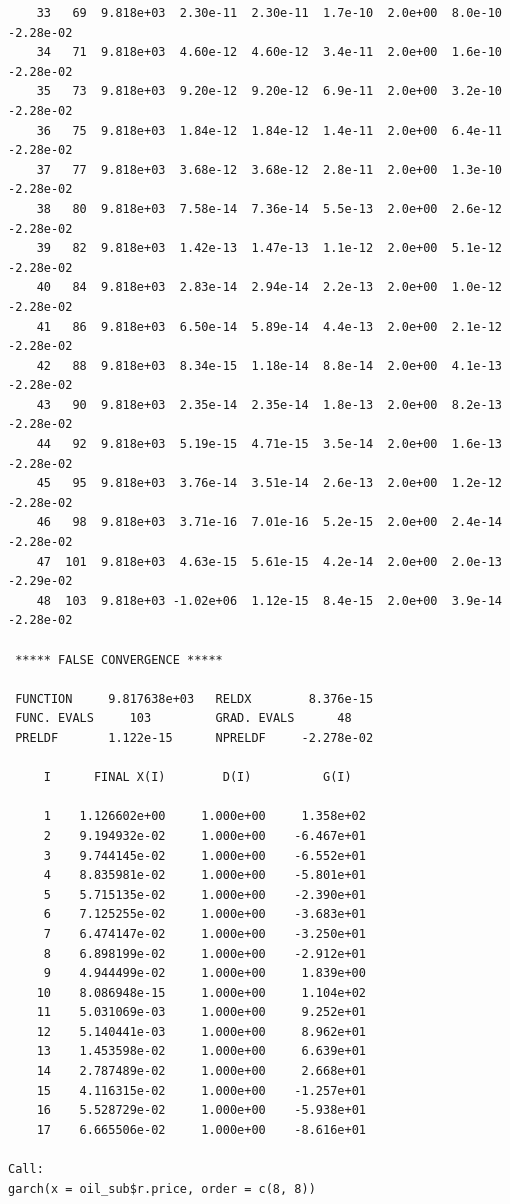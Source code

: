 \documentclass[11pt]{article}\usepackage[]{graphicx}\usepackage[]{color}
\makeatletter
\newenvironment{kframe}{%
 \def\at@end@of@kframe{}%
 \ifinner\ifhmode%
  \def\at@end@of@kframe{\end{minipage}}%
  \begin{minipage}{\columnwidth}%
 \fi\fi%
 \def\FrameCommand##1{\hskip\@totalleftmargin \hskip-\fboxsep
 \colorbox{shadecolor}{##1}\hskip-\fboxsep
     \hskip-\linewidth \hskip-\@totalleftmargin \hskip\columnwidth}%
 \MakeFramed {\advance\hsize-\width
   \@totalleftmargin\z@ \linewidth\hsize
   \@setminipage}}%
 {\par\unskip\endMakeFramed%
 \at@end@of@kframe}
\newenvironment{knitrout}{}{} %
\makeatother
\begin{document}
\begin{knitrout}
\begin{kframe}
\begin{verbatim}
    33   69  9.818e+03  2.30e-11  2.30e-11  1.7e-10  2.0e+00  8.0e-10 -2.28e-02
    34   71  9.818e+03  4.60e-12  4.60e-12  3.4e-11  2.0e+00  1.6e-10 -2.28e-02
    35   73  9.818e+03  9.20e-12  9.20e-12  6.9e-11  2.0e+00  3.2e-10 -2.28e-02
    36   75  9.818e+03  1.84e-12  1.84e-12  1.4e-11  2.0e+00  6.4e-11 -2.28e-02
    37   77  9.818e+03  3.68e-12  3.68e-12  2.8e-11  2.0e+00  1.3e-10 -2.28e-02
    38   80  9.818e+03  7.58e-14  7.36e-14  5.5e-13  2.0e+00  2.6e-12 -2.28e-02
    39   82  9.818e+03  1.42e-13  1.47e-13  1.1e-12  2.0e+00  5.1e-12 -2.28e-02
    40   84  9.818e+03  2.83e-14  2.94e-14  2.2e-13  2.0e+00  1.0e-12 -2.28e-02
    41   86  9.818e+03  6.50e-14  5.89e-14  4.4e-13  2.0e+00  2.1e-12 -2.28e-02
    42   88  9.818e+03  8.34e-15  1.18e-14  8.8e-14  2.0e+00  4.1e-13 -2.28e-02
    43   90  9.818e+03  2.35e-14  2.35e-14  1.8e-13  2.0e+00  8.2e-13 -2.28e-02
    44   92  9.818e+03  5.19e-15  4.71e-15  3.5e-14  2.0e+00  1.6e-13 -2.28e-02
    45   95  9.818e+03  3.76e-14  3.51e-14  2.6e-13  2.0e+00  1.2e-12 -2.28e-02
    46   98  9.818e+03  3.71e-16  7.01e-16  5.2e-15  2.0e+00  2.4e-14 -2.28e-02
    47  101  9.818e+03  4.63e-15  5.61e-15  4.2e-14  2.0e+00  2.0e-13 -2.29e-02
    48  103  9.818e+03 -1.02e+06  1.12e-15  8.4e-15  2.0e+00  3.9e-14 -2.28e-02

 ***** FALSE CONVERGENCE *****

 FUNCTION     9.817638e+03   RELDX        8.376e-15
 FUNC. EVALS     103         GRAD. EVALS      48
 PRELDF       1.122e-15      NPRELDF     -2.278e-02

     I      FINAL X(I)        D(I)          G(I)

     1    1.126602e+00     1.000e+00     1.358e+02
     2    9.194932e-02     1.000e+00    -6.467e+01
     3    9.744145e-02     1.000e+00    -6.552e+01
     4    8.835981e-02     1.000e+00    -5.801e+01
     5    5.715135e-02     1.000e+00    -2.390e+01
     6    7.125255e-02     1.000e+00    -3.683e+01
     7    6.474147e-02     1.000e+00    -3.250e+01
     8    6.898199e-02     1.000e+00    -2.912e+01
     9    4.944499e-02     1.000e+00     1.839e+00
    10    8.086948e-15     1.000e+00     1.104e+02
    11    5.031069e-03     1.000e+00     9.252e+01
    12    5.140441e-03     1.000e+00     8.962e+01
    13    1.453598e-02     1.000e+00     6.639e+01
    14    2.787489e-02     1.000e+00     2.668e+01
    15    4.116315e-02     1.000e+00    -1.257e+01
    16    5.528729e-02     1.000e+00    -5.938e+01
    17    6.665506e-02     1.000e+00    -8.616e+01

Call:
garch(x = oil_sub$r.price, order = c(8, 8))


\end{verbatim}
\end{kframe}
\end{knitrout}
\end{document}

